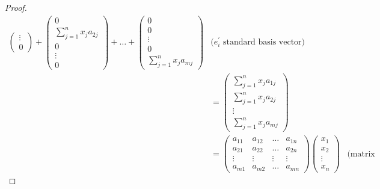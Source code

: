 \begin{proof}
\begin{align*}
\begin{pmatrix}
                    \vdots \\
                    0
                \end{pmatrix} +
                \begin{pmatrix}
                    0 \\
                    \sum_{j=1}^{n} x_{j} a_{2j} \\
                    0 \\
                    \vdots \\
                    0
                \end{pmatrix} + \dots +
                \begin{pmatrix}
                    0 \\
                    0 \\
                    \vdots \\
                    0 \\
                    \sum_{j=1}^{n} x_{j} a_{mj}
                \end{pmatrix}                                          &\text{($e_{i}^{\prime}$ standard basis vector)} \\
             &= \begin{pmatrix}
                    \sum_{j=1}^{n} x_{j} a_{1j} \\
                    \sum_{j=1}^{n} x_{j} a_{2j} \\
                    \vdots \\
                    \sum_{j=1}^{n} x_{j} a_{mj}
                \end{pmatrix} \\
             &= \begin{pmatrix}
                    a_{11} & a_{12} & \dots & a_{1n} \\
                    a_{21} & a_{22} & \dots & a_{2n} \\
                    \vdots & \vdots & \vdots & \vdots \\
                    a_{m1} & a_{m2} & \dots & a_{mn}
                \end{pmatrix}
                \begin{pmatrix}
                    x_{1} \\
                    x_{2} \\
                    \vdots \\
                    x_{n}
                \end{pmatrix}                                          &\text{(matrix multiplication)}

\end{align*}
\end{proof}
